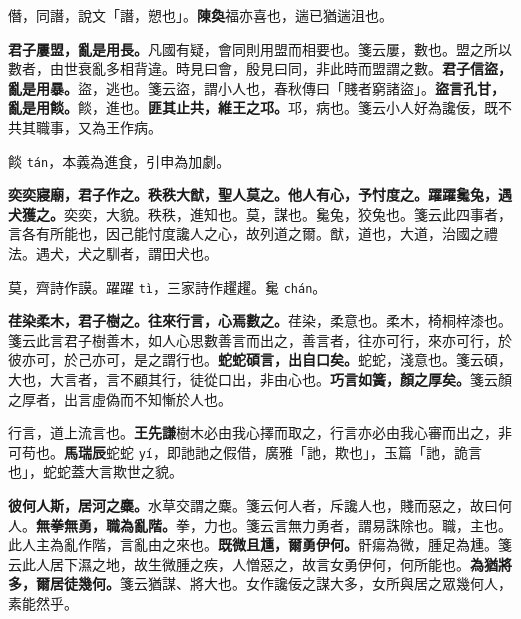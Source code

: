 \begin{quoting}僭，同譖，說文「譖，愬也」。\textbf{陳奐}福亦喜也，遄已猶遄沮也。\end{quoting}

\textbf{君子屢盟，亂是用長。}{\footnotesize 凡國有疑，會同則用盟而相要也。箋云屢，數也。盟之所以數者，由世衰亂多相背違。時見曰會，殷見曰同，非此時而盟謂之數。}\textbf{君子信盜，亂是用暴。}{\footnotesize 盜，逃也。箋云盜，謂小人也，春秋傳曰「賤者窮諸盜」。}\textbf{盜言孔甘，亂是用餤。}{\footnotesize 餤，進也。}\textbf{匪其止共，維王之邛。}{\footnotesize 邛，病也。箋云小人好為讒佞，既不共其職事，又為王作病。}

\begin{quoting}餤 \texttt{tán}，本義為進食，引申為加劇。\end{quoting}

\textbf{奕奕寢廟，君子作之。秩秩大猷，聖人莫之。他人有心，予忖度之。躍躍毚兔，遇犬獲之。}{\footnotesize 奕奕，大貌。秩秩，進知也。莫，謀也。毚兔，狡兔也。箋云此四事者，言各有所能也，因己能忖度讒人之心，故列道之爾。猷，道也，大道，治國之禮法。遇犬，犬之馴者，謂田犬也。}

\begin{quoting}莫，齊詩作謨。躍躍 \texttt{tì}，三家詩作趯趯。毚 \texttt{chán}。\end{quoting}

\textbf{荏染柔木，君子樹之。往來行言，心焉數之。}{\footnotesize 荏染，柔意也。柔木，椅桐梓漆也。箋云此言君子樹善木，如人心思數善言而出之，善言者，往亦可行，來亦可行，於彼亦可，於己亦可，是之謂行也。}\textbf{蛇蛇碩言，出自口矣。}{\footnotesize 蛇蛇，淺意也。箋云碩，大也，大言者，言不顧其行，徒從口出，非由心也。}\textbf{巧言如簧，顏之厚矣。}{\footnotesize 箋云顏之厚者，出言虛偽而不知慚於人也。}

\begin{quoting}行言，道上流言也。\textbf{王先謙}樹木必由我心擇而取之，行言亦必由我心審而出之，非可苟也。\textbf{馬瑞辰}蛇蛇 \texttt{yí}，即訑訑之假借，廣雅「訑，欺也」，玉篇「訑，詭言也」，蛇蛇蓋大言欺世之貌。\end{quoting}

\textbf{彼何人斯，居河之麋。}{\footnotesize 水草交謂之麋。箋云何人者，斥讒人也，賤而惡之，故曰何人。}\textbf{無拳無勇，職為亂階。}{\footnotesize 拳，力也。箋云言無力勇者，謂易誅除也。職，主也。此人主為亂作階，言亂由之來也。}\textbf{既微且尰，爾勇伊何。}{\footnotesize 骭瘍為微，腫足為尰。箋云此人居下濕之地，故生微腫之疾，人憎惡之，故言女勇伊何，何所能也。}\textbf{為猶將多，爾居徒幾何。}{\footnotesize 箋云猶謀、將大也。女作讒佞之謀大多，女所與居之眾幾何人，素能然乎。}

